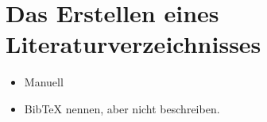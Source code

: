 %
%                    
%
%
%
%


\section{Das Erstellen eines Literaturverzeichnisses}

\begingroup\sffamily
\begin{itemize}
\item Manuell
\item BibTeX nennen, aber nicht beschreiben.
\end{itemize}
\endgroup

